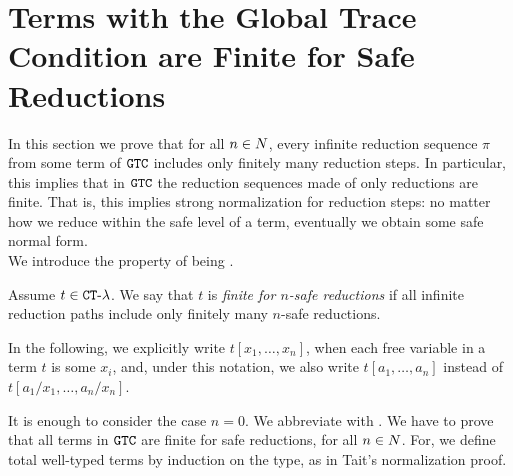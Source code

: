 \section{Terms with the Global Trace Condition are Finite for Safe Reductions}

\label{section-finite-safe-reductions}
In this section we prove that for all $n \in {N}$, every infinite reduction sequence $\pi$ 
from some term of ${\tt GTC}$ includes
only finitely many  reduction steps.    
In particular,
this implies that in ${\tt GTC}$ the reduction sequences made of only  reductions 
are finite. That is, this implies strong normalization for  reduction steps:
no matter how we reduce within the safe level of a term, eventually we obtain some safe normal form.
\\

We introduce the property of being .

\begin{definition}
\label{definition-finite-n-safe-reduction}
Assume $t \in { {\tt CT} \mbox{-} \lambda}$. We say that $t$ is \emph{finite for $n$-safe reductions} if all infinite
reduction paths include only finitely many $n$-safe reductions.
\end{definition}

In the following, we explicitly write $t[x_1,\ldots,x_n]$,
when each free variable in a term $t$ is some $x_i$, 
and, under this notation, we also write $t[a_1,\ldots,a_n]$ instead of $t[a_1/x_1,\ldots,a_n/x_n]$. 

It is enough to consider the case $n=0$. 
We abbreviate  with .
We have to prove that all terms in ${\tt GTC}$ are finite for safe reductions, for all $n \in {N}$.
For, we define total well-typed terms by induction on the type, as in Tait's normalization proof.


